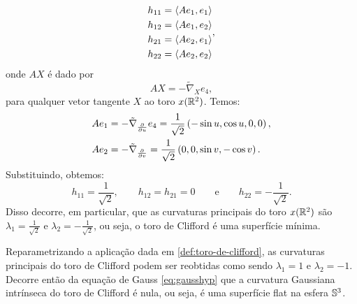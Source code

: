 \begin{exemplo}
	\begin{equation*}
		\begin{split}
			h_{11} &= \left\langle A e_1,e_1 \right\rangle\\
			h_{12} &= \left\langle A e_1,e_2 \right\rangle\\
			h_{21} &= \left\langle A e_2,e_1 \right\rangle\\
			h_{22} &= \left\langle A e_2,e_2 \right\rangle
		\end{split},
	\end{equation*}
	onde $AX$ é dado por
	\[ AX = -\tilde{\nabla}_X e_4, \]
	para qualquer vetor tangente $X$ ao toro $x(\mathbb{R}^2)$. Temos:
	\begin{align*}
		A e_1 &= -\tilde{\nabla}_{\frac{\partial}{\partial u}} e_4 = \frac{1}{\sqrt{2}} \left( -\sin u, \cos u, 0, 0 \right),\\
		A e_2 &= -\tilde{\nabla}_{\frac{\partial}{\partial v}} = \frac{1}{\sqrt{2}} \left( 0,0, \sin v, -\cos v \right).
	\end{align*}
	Substituindo, obtemos:
	\[ h_{11} = \frac{1}{\sqrt{2}}, \qquad h_{12}=h_{21}=0 \qquad \text{e} \qquad h_{22} = -\frac{1}{\sqrt{2}}. \]
	Disso decorre, em particular, que as curvaturas principais do toro $x(\mathbb{R}^2)$ são $\lambda_1 = \frac{1}{\sqrt{2}}$ e $\lambda_2 = -\frac{1}{\sqrt{2}}$, ou seja, o toro de Clifford é uma superfície mínima.
\end{exemplo}

\begin{observacao}
	Reparametrizando a aplicação dada em \eqref{def:toro-de-clifford}, as curvaturas principais do toro de Clifford podem ser reobtidas como sendo $\lambda_1=1$ e $\lambda_2=-1$. Decorre então da equação de Gauss \eqref{eq:gausshyp} que a curvatura Gaussiana intrínseca do toro de Clifford é nula, ou seja, é uma superfície flat na esfera $\mathbb{S}^3$.
\end{observacao}


